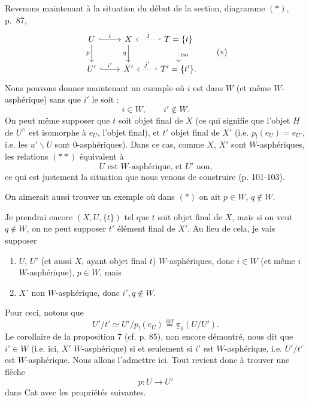 \documentclass[11pt]{article}
\newcommand{\printedpage}[1]{\marginpar{\footnotesize p.~#1}}
\newcommand{\msp}[1]{\marginpar{\footnotesize [#1]}}
\begin{document}
\msp{page 104}
Revenons maintenant à la situation du début de la section, diagramme $(*)$, p.~87,
\[
\begin{tikzcd}
U \arrow[r, hook, "i"] \arrow[d, "p"'] & X \arrow[d, "q"'] & T = \{t\} \arrow[l, hook', dotted, "j"'] \arrow[d, dotted, "\mathrm{iso}"] \\
U' \arrow[r, hook, "i'"] & X' & T' = \{t'\}. \arrow[l, hook', dotted, "j'"']
\end{tikzcd}
\tag*{$(*)$}
\]
Nous pouvons donner maintenant un exemple où $i$ est dans $W$ (et même $W$-asphérique) sans que $i'$ le soit :
\[
i \in W, \qquad i' \notin W. \tag*{$(**)$}
\]
On peut même supposer que $t$ soit objet final de $X$ (ce qui signifie que l'objet $H$ de $U^\wedge$ est isomorphe à $e_U$, l'objet final), et $t'$ objet final de $X'$ (i.e. $p_!(e_U) = e_{U'}$, i.e. les $u'\backslash U$ sont 0-asphériques). Dans ce cas, comme $X$, $X'$ sont $W$-asphériques, les relations $(**)$ équivalent à
\[
U \text{ est } W\text{-asphérique, et } U' \text{ non,} \tag*{$(***)$}
\]
ce qui est justement la situation que nous venons de construire (p. 101-103).

On aimerait aussi trouver un exemple où dans $(*)$ on ait $p \in W$, $q \notin W$.

\setcounter{footnote}{76}

\printedpage{73}

\msp{page 105}

Je prendrai encore $(X,U,\{t\})$ tel que $t$ soit objet final de $X$, mais si on veut $q\notin W$, on ne peut supposer $t'$ élément final de $X'$. Au lieu de cela, je vais supposer

\begin{enumerate}[label=\alph*)]
\item $U$, $U'$ (et aussi $X$, ayant objet final $t$) $W$-asphériques, donc $i\in W$ (et même $i$ $W$-asphérique), $p\in W$, mais
\item $X'$ non $W$-asphérique, donc $i',q\notin W$.
\end{enumerate}

Pour ceci, notons que
\[ U'/t'\simeq U'/p_!(e_U)\overset{\text{déf}}{=}\underline{\pi}_0(U/U'). \]
Le corollaire de la proposition 7 (cf. p. 85), non encore démontré, nous dit que $i'\in W$ (i.e. ici, $X'$ $W$-asphérique) si et seulement si $i'$ est $W$-asphérique, i.e. $U'/t'$ est $W$-asphérique. Nous allons l'admettre ici. Tout revient donc à trouver une flèche
\[ p:U\longrightarrow U' \]
dans Cat avec les propriétés suivantes.
\end{document}
